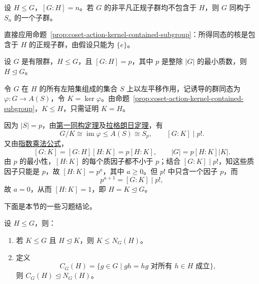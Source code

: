 \begin{corollary}\label{cor:core-free-subgroup-permutation-embedding}
设 $H\leq G$，$[G:H]=n$。若 $G$ 的非平凡正规子群均不包含于 $H$，则 $G$ 同构于 $S_n$ 的一个子群。
\end{corollary}

\begin{purpleproof}
直接应用命题~\ref{prop:coset-action-kernel-contained-subgroup}：所得同态的核是包含于 $H$ 的正规子群，由假设只能为 $\{e\}$。
\end{purpleproof}

\begin{corollary}\label{cor:smallest-prime-index-subgroup-normal}
设 $G$ 是有限群，$H\leq G$，且 $[G:H]=p$，其中 $p$ 是整除 $|G|$ 的最小质数，则 $H\trianglelefteq G$。
\end{corollary}

\begin{purpleproof}
令 $G$ 在 $H$ 的所有左陪集组成的集合 $S$ 上以左平移作用，记诱导的群同态为 $\varphi:G\to A(S)$，令 $K=\ker\varphi$。由命题~\ref{prop:coset-action-kernel-contained-subgroup}，$K\leq H$，只需证明 $K=H$。

因为 $|S|=p$，由\hyperref[cor:first-isomorphism]{第一同构定理}及\hyperref[cor:lagrange]{拉格朗日定理}，有
\[
  G/K\cong\operatorname{im}\varphi\leq A(S)\cong S_p,
  \qquad [G:K]\mid p!.
\]
又由\hyperref[thm:index-multiplication]{指数乘法公式}，
\[
  [G:K]=[G:H][H:K]=p[H:K],
  \qquad |G|=p[H:K]|K|.
\]
由 $p$ 的最小性，$[H:K]$ 的每个质因子都不小于 $p$；结合 $[G:K]\mid p!$，知这些质因子只能是 $p$，故 $[H:K]=p^a$，其中 $a\geq0$。但 $p!$ 中只含一个因子 $p$，而
\[
  p^{a+1}=[G:K]\mid p!,
\]
故 $a=0$，从而 $[H:K]=1$，即 $H=K\trianglelefteq G$。
\end{purpleproof}

下面是本节的一些习题结论。

\begin{proposition}\label{prop:normalizer-centralizer-subgroup-properties}
设 $H\leq G$，则：
\begin{enumerate}[label=(\arabic*)]
  \item 若 $K\leq G$ 且 $H\trianglelefteq K$，则 $K\leq N_G(H)$。
  \item 定义
  \[
    C_G(H)=\{g\in G\mid gh=hg\text{ 对所有 }h\in H\text{ 成立}\},
  \]
  则 $C_G(H)\trianglelefteq N_G(H)$。
\end{enumerate}
\end{proposition}

